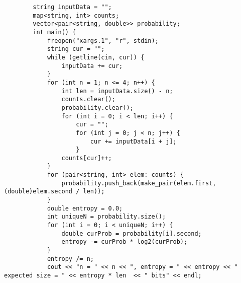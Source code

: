 \documentclass[12pt]{article}
\begin{document}
	\begin{verbatim}
		string inputData = "";
		map<string, int> counts;
		vector<pair<string, double>> probability;
		int main() {
			freopen("xargs.1", "r", stdin);
			string cur = "";
			while (getline(cin, cur)) {
				inputData += cur;
			}
			for (int n = 1; n <= 4; n++) {
				int len = inputData.size() - n;
				counts.clear();
				probability.clear();
				for (int i = 0; i < len; i++) {
					cur = "";
					for (int j = 0; j < n; j++) {
						cur += inputData[i + j];
					}		
				counts[cur]++;
			}       	
			for (pair<string, int> elem: counts) {
				probability.push_back(make_pair(elem.first, (double)elem.second / len));
			}
			double entropy = 0.0;
			int uniqueN = probability.size();
			for (int i = 0; i < uniqueN; i++) {
				double curProb = probability[i].second;
				entropy -= curProb * log2(curProb);
			}
			entropy /= n;
			cout << "n = " << n << ", entropy = " << entropy << " expected size = " << entropy * len  << " bits" << endl;
	\end{verbatim}
\end{document}
